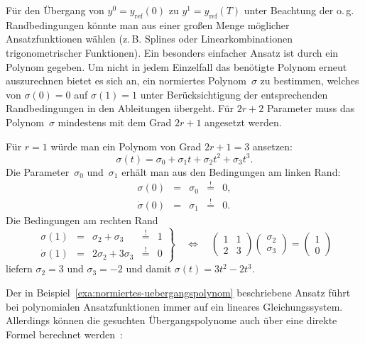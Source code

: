 Für den Übergang von $y^{0}=y_{\text{ref}}(0)$ zu $y^{1}=y_{\text{ref}}(T)$
unter Beachtung der o.\,g. Randbedingungen könnte man aus einer großen
Menge möglicher Ansatzfunktionen wählen (z.\,B. Splines oder Linearkombinationen
trigonometrischer Funktionen). Ein besonders einfacher Ansatz ist
durch ein Polynom gegeben. Um nicht in jedem Einzelfall das benötigte
Polynom erneut auszurechnen bietet es sich an, ein normiertes Polynom~$\sigma$
zu bestimmen, welches von $\sigma(0)=0$ auf $\sigma(1)=1$ unter
Berücksichtigung der entsprechenden Randbedingungen in den Ableitungen
übergeht. Für $2r+2$ Parameter muss das Polynom~$\sigma$ mindestens
mit dem Grad $2r+1$ angesetzt werden.
\begin{example}
\label{exa:normiertes-uebergangspolynom}Für $r=1$ würde man ein
Polynom von Grad $2r+1=3$ ansetzen:
\[
\sigma(t)=\sigma_{0}+\sigma_{1}t+\sigma_{2}t^{2}+\sigma_{3}t^{3}.
\]
Die Parameter~$\sigma_{0}$ und~$\sigma_{1}$ erhält man aus den
Bedingungen am linken Rand:
\[
\begin{array}{lclcl}
\sigma(0) & = & \sigma_{0} & \stackrel{!}{=} & 0,\\
\dot{\sigma}(0) & = & \sigma_{1} & \stackrel{!}{=} & 0.
\end{array}
\]
Die Bedingungen am rechten Rand 
\[
\left.\begin{array}{lclcl}
\sigma(1) & = & \sigma_{2}+\sigma_{3} & \stackrel{!}{=} & 1\\
\dot{\sigma}(1) & = & 2\sigma_{2}+3\sigma_{3} & \stackrel{!}{=} & 0
\end{array}\right\} \quad\Leftrightarrow\quad\left(\begin{array}{cc}
1 & 1\\
2 & 3
\end{array}\right)\left(\begin{array}{c}
\sigma_{2}\\
\sigma_{3}
\end{array}\right)=\left(\begin{array}{c}
1\\
0
\end{array}\right)
\]
liefern $\sigma_{2}=3$ und $\sigma_{3}=-2$ und damit $\sigma(t)=3t^{2}-2t^{3}$. 

\end{example}
Der in Beispiel~\ref{exa:normiertes-uebergangspolynom} beschriebene
Ansatz führt bei polynomialen Ansatzfunktionen immer auf ein lineares
Gleichungssystem. Allerdings können die gesuchten Übergangspolynome
auch über eine direkte Formel berechnet werden~\cite{piazzi2001tac,piazzi2001automatica}:
